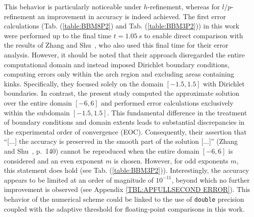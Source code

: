 \documentclass[a4paper,12pt]{paper}
\begin{document}
This behavior is particularly noticeable under \(h\)-refinement, whereas for \(l/p\)-refinement an improvement in accuracy is indeed achieved. The first error calculations (Tab. (\ref{table:BBM8P2}) and Tab. (\ref{table:BBM3P2})) in this work were performed up to the final time \(t=1.05\,s\) to enable direct comparison with the results of Zhang and Shu~\cite{Zhang2009}, who also used this final time for their error analysis. However, it should be noted that their approach disregarded the entire computational domain and instead imposed Dirichlet boundary conditions, computing errors only within the arch region and excluding areas containing kinks. Specifically, they focused solely on the domain \([-1.5, 1.5]\) with Dirichlet boundaries. In contrast, the present study computed the approximate solution over the entire domain \([-6,6]\) and performed error calculations exclusively within the subdomain \([-1.5,1.5]\). This fundamental difference in the treatment of boundary conditions and domain extents leads to substantial discrepancies in the experimental order of convergence (EOC). Consequently, their assertion that ``[...] the accuracy is preserved in the smooth part of the solution [...]'' (Zhang and Shu~\cite{Zhang2009}, p.~140) cannot be reproduced when the entire domain \([-6,6]\) is considered and an even exponent \(m\) is chosen. However, for odd exponents \(m\), this statement does hold (see Tab. (\ref{table:BBM3P2})). Interestingly, the accuracy appears to be limited at an order of magnitude of \(10^{-11}\), beyond which no further improvement is observed (see Appendix \ref{TBL:APFULLSECOND ERROR}). This behavior of the numerical scheme could be linked to the use of \texttt{double}
precision coupled with the adaptive threshold for floating-point comparisons in this work.\\
\begin{table}[h]
		\centering
		\caption{Error calculation results for the parameters $l=2,~m=3$ and the final time $t=1.05s$ with the Barenblatt function at $t=1s$ as initial data.}
		\label{table:BBM3P2}
\end{table}\\
\end{document}
